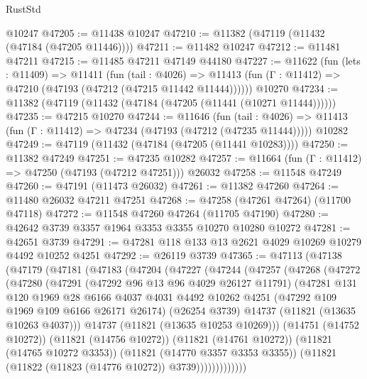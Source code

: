 \begin{lexlean}{RustStd}
\begin{coremodule}
    @10247
@47205 := @11438 @10247
@47210 := @11382 (@47119 (@11432 (@47184 (@47205 @11446))))
@47211 := @11482 @10247
@47212 := @11481 @47211
@47215 := @11485 @47211 @47149 @44180
@47227 := @11622
    (fun (lets : @11409) =>
    @11411
      (fun (tail : @4026) =>
      @11413 (fun (Γ : @11412) => @47210 (@47193 (@47212 (@47215 @11442 @11444))))))
    @10270
@47234 := @11382 (@47119 (@11432 (@47184 (@47205 (@11441 (@10271 @11444))))))
@47235 := @47215 @10270
@47244 := @11646
    (fun (tail : @4026) => @11413 (fun (Γ : @11412) => @47234 (@47193 (@47212 (@47235 @11444)))))
    @10282
@47249 := @47119 (@11432 (@47184 (@47205 (@11441 @10283))))
@47250 := @11382 @47249
@47251 := @47235 @10282
@47257 := @11664 (fun (Γ : @11412) => @47250 (@47193 (@47212 @47251))) @26032
@47258 := @11548 @47249
@47260 := @47191 (@11473 @26032)
@47261 := @11382 @47260
@47264 := @11480 @26032 @47211 @47251
@47268 := @47258 (@47261 @47264) (@11700 @47118)
@47272 := @11548 @47260 @47264 (@11705 @47190)
@47280 := @42642 @3739 @3357 @1964 @3353 @3355 @10270 @10280 @10272
@47281 := @42651 @3739
@47291 := @47281 @118 @133 @13 @2621 @4029 @10269 @10279 @4492 @10252 @4251
@47292 := @26119 @3739
@47365 := @47113
    (@47138
      (@47179
        (@47181
          (@47183
            (@47204
              (@47227
                (@47244
                  (@47257
                    (@47268
                      (@47272
                        (@47280
                          (@47291
                            (@47292 @96 @13 @96 @4029 @26127 @11791)
                            (@47281
                              @131
                              @120
                              @1969
                              @28
                              @6166
                              @4037
                              @4031
                              @4492
                              @10262
                              @4251
                              (@47292 @109 @1969 @109 @6166 @26171 @26174)
                              (@26254 @3739)
                              @14737
                              (@11821 (@13635 @10263 @4037)))
                            @14737
                            (@11821 (@13635 @10253 @10269)))
                          (@14751 (@14752 @10272))
                          (@11821 (@14756 @10272))
                          (@11821 (@14761 @10272))
                          (@11821 (@14765 @10272 @3353))
                          (@11821 (@14770 @3357 @3353 @3355))
                          (@11821 (@11822 (@11823 (@14776 @10272)) @3739)))))))))))))

\end{coremodule}
\end{lexlean}

